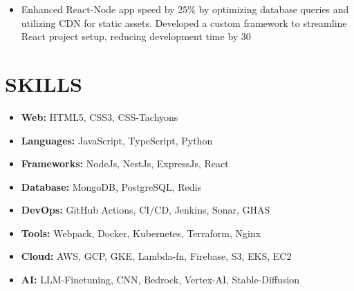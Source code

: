 \documentclass[line, margin, 12pt]{res}
\begin{document}
\begin{resume}
\begin{itemize}
\item Enhanced React-Node app speed by 25\% by optimizing database queries and utilizing CDN for static assets. Developed a custom framework to streamline React project setup, reducing development time by 30%
\end{itemize}


\section{SKILLS}
\begin{itemize}
\item \textbf{Web:} HTML5, CSS3, CSS-Tachyons
\item \textbf{Languages:} JavaScript, TypeScript, Python
\item \textbf{Frameworks:} NodeJs, NestJs, ExpressJs, React
\item \textbf{Database:} MongoDB, PostgreSQL, Redis
\item \textbf{DevOps:} GitHub Actions, CI/CD, Jenkins, Sonar, GHAS
\item \textbf{Tools:} Webpack, Docker, Kubernetes, Terraform, Nginx
\item \textbf{Cloud:} AWS, GCP, GKE, Lambda-fn, Firebase, S3, EKS, EC2
\item \textbf{AI:} LLM-Finetuning, CNN, Bedrock, Vertex-AI, Stable-Diffusion
\end{itemize}

\end{resume}
\end{document}
